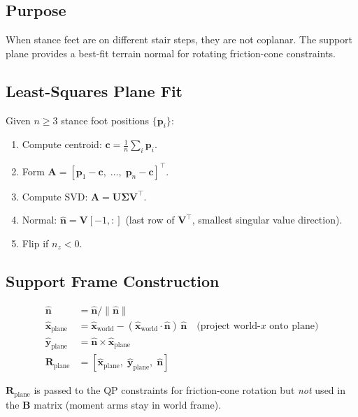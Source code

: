 \documentclass[12pt,a4paper]{report}
\newcommand{\vect}[1]{\bm{#1}}
\newcommand{\mat}[1]{\mathbf{#1}}
\begin{document}
\subsection{Purpose}

When stance feet are on different stair steps, they are not coplanar.
The support plane provides a best-fit terrain normal for rotating friction-cone
constraints.

\subsection{Least-Squares Plane Fit}

Given $n \geq 3$ stance foot positions $\{\vect{p}_i\}$:

\begin{enumerate}
  \item Compute centroid: $\vect{c} = \frac{1}{n}\sum_i \vect{p}_i$.
  \item Form $\mat{A} = [\vect{p}_1 - \vect{c},\; \ldots,\; \vect{p}_n - \vect{c}]^\top$.
  \item Compute SVD: $\mat{A} = \mat{U}\mat{\Sigma}\mat{V}^\top$.
  \item Normal: $\hat{\vect{n}} = \mat{V}[-1,:]$ (last row of $\mat{V}^\top$,
        smallest singular value direction).
  \item Flip if $n_z < 0$.
\end{enumerate}

\subsection{Support Frame Construction}

\begin{align}
    \hat{\vect{n}} &= \hat{\vect{n}} / \|\hat{\vect{n}}\| \\
    \hat{\vect{x}}_\text{plane} &= \hat{\vect{x}}_\text{world} -
    (\hat{\vect{x}}_\text{world}\cdot\hat{\vect{n}})\,\hat{\vect{n}}
    \quad\text{(project world-}x\text{ onto plane)} \\
    \hat{\vect{y}}_\text{plane} &= \hat{\vect{n}} \times \hat{\vect{x}}_\text{plane} \\
    \mat{R}_\text{plane} &= [\hat{\vect{x}}_\text{plane},\;
                              \hat{\vect{y}}_\text{plane},\;
                              \hat{\vect{n}}]
\end{align}

$\mat{R}_\text{plane}$ is passed to the QP constraints for friction-cone
rotation but \emph{not} used in the $\mat{B}$ matrix (moment arms stay in
world frame).
\end{document}
